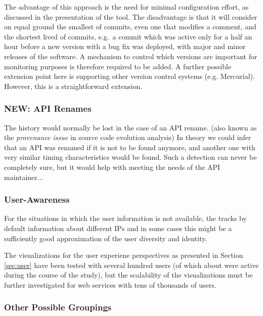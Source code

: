   The advantage of this approach is the need for minimal configuration effort, as discussed in the presentation of the tool. The disadvantage is that it will consider on equal ground the smallest of commits, even one that modifies a comment, and the shortest lived of commits, e.g.~a commit which was active only for a half an hour before a new version with a bug fix was deployed, with major and minor releases of the software. %
  A mechanism to control which versions are important for monitoring purposes is therefore required to be added.
%
  A further possible extension point here is supporting other version control systems (e.g. Mercurial). However, this is a straightforward extension.

  \subsubsection{NEW: API Renames}


    The history would normally be lost in the case of an API rename. (also known as the {\em provenance issue} in source code evolution analysis)
    In theory we could infer that an API was renamed if it is not to be found anymore, and another one with very similar timing characteristics would be found. Such a detection can never be completely sure, but it would help with meeting the needs of the API maintainer... 

  \subsubsection{User-Awareness }

    For the situations in which the user information is not available, the \tool tracks by default information about different IPs and in some cases this might be a sufficiently good approximation of the user diversity and identity. 

    The visualizations for the user experiene perspectives as presented in Section \ref{sec:user} have been tested with several hundred users (of which about \activeUserCount were active during the course of the study), but the scalability of the visualizations must be further investigated for web services with tens of thousands of users.


  \subsubsection{Other Possible Groupings}

